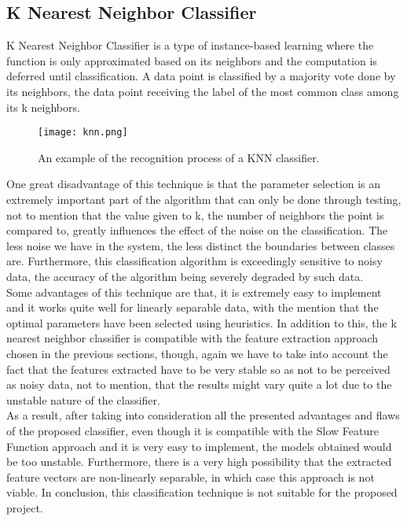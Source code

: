 \documentclass[11pt]{report}
\begin{document}
\subsection{K Nearest Neighbor Classifier}
K Nearest Neighbor Classifier is a type of instance-based learning where the function is only approximated based on its neighbors and the computation is deferred until classification. A data point is classified by a majority vote done by its neighbors, the data point receiving the label of the most common class among its k neighbors. \\

\begin{figure}
    \centering
    \texttt{[image: knn.png]}
    \caption{An example of the recognition process of a KNN classifier.} 
    \label{fig:knn}
\end{figure}

One great disadvantage of this technique is that the parameter selection is an extremely important part of the algorithm that can only be done through testing, not to mention that the value given to k, the number of neighbors the point is compared to, greatly influences the effect of the noise on the classification. The less noise we have in the system, the less distinct the boundaries between classes are. Furthermore, this classification algorithm is exceedingly sensitive to noisy data, the accuracy of the algorithm being severely degraded by such data. \\
Some advantages of this technique are that, it is extremely easy to implement and it works quite well for linearly separable data, with the mention that the optimal parameters have been selected using heuristics. In addition to this, the k nearest neighbor classifier is compatible with the feature extraction approach chosen in the previous sections, though, again we have to take into account the fact that the features extracted have to be very stable so as not to be perceived as noisy data, not to mention, that the results might vary quite a lot due to the unstable nature of the classifier. \\
As a result, after taking into consideration all the presented advantages and flaws of the proposed classifier, even though it is compatible with the Slow Feature Function approach and it is very easy to implement, the models obtained would be too unstable. Furthermore, there is a very high possibility that the extracted feature vectors are non-linearly separable, in which case this approach is not viable. In conclusion, this classification technique is not suitable for the proposed project. \\
\end{document}
